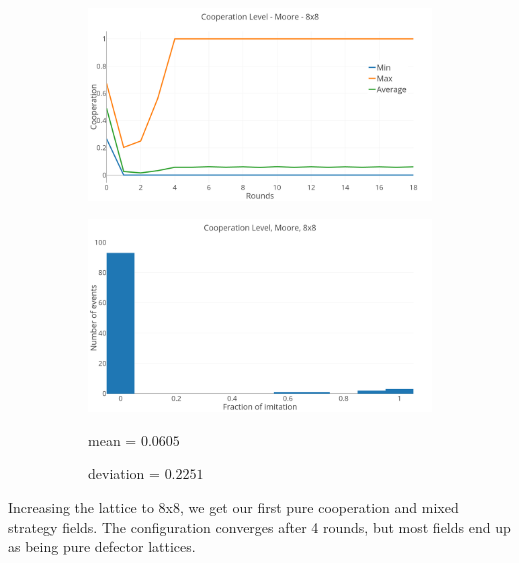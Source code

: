 \documentclass[a4paper, 11pt]{article}
\begin{document}
\begin{figure}[H]
\begin{subfigure}{.75\textwidth}
	\includegraphics[width=1\linewidth]{PDMoore8x8}
\end{subfigure}

\begin{subfigure}{.75\textwidth}
	\includegraphics[width=1\linewidth]{PDMoore8x8HG}
\end{subfigure}%
\begin{subfigure}{.25\textwidth}
	mean = $0.0605$
	
	deviation = $0.2251$
\end{subfigure}

\end{figure}

Increasing the lattice to 8x8, we get our first pure cooperation and mixed strategy fields. The configuration converges after 4 rounds, but most fields end up as being pure defector lattices.

\newpage

\end{document}
